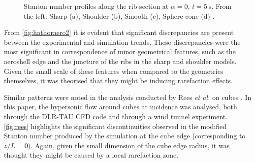 \begin{figure}[ht]
\begin{subfigure}{0.24\textwidth}
        \caption{}
        \label{subfig:d}
    \end{subfigure}
    \caption{Stanton number profiles along the rib section at $\alpha=0$, $t = \qty{5}{\s}$. From the left: Sharp (a), Shoulder (b), Smooth (c), Sphere-cone (d) \cite{hathoraero2}.}
    \label{fig:hathoraero2}
\end{figure}

From \autoref{fig:hathoraero2} it is evident that significant discrepancies are present between the experimental and simulation trends. These discrepancies were the most significant in correspondence of minor geometrical features, such as the aeroshell edge and the juncture of the ribs in the sharp and shoulder models. Given the small scale of these features when compared to the geometries themselves, it was theorised that they might be inducing rarefaction effects. 

Similar patterns were noted in the analysis conducted by Rees \textit{et al.} on cubes \cite{rees}. In this paper, the hypersonic flow around cubes at incidence was analysed, both through the DLR-TAU CFD code and through a wind tunnel experiment. \autoref{fig:rees} highlights the significant discontinuities observed in the modified Stanton number produced by the simulation at the cube edge (corresponding to $z/L = 0$). Again, given the small dimension of the cube edge radius, it was thought they might be caused by a local rarefaction zone.

